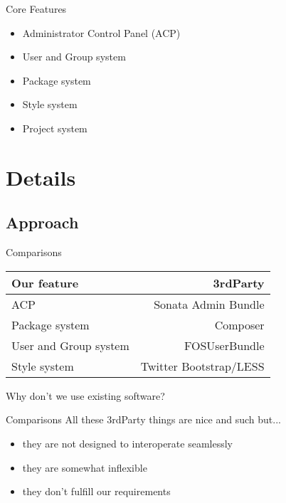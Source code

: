 \documentclass{beamer}
\begin{document}
	\begin{frame}{Core Features}
		\begin{itemize}
			\item Administrator Control Panel (ACP)
			\item User and Group system
			\item Package system
			\item Style system
			\item Project system
		\end{itemize}
	\end{frame}
	
	\section{Details}
	\subsection{Approach}
	\begin{frame}{Comparisons}
		\begin{table}
			\begin{tabular}{l|r}
				Our feature & 3rdParty \\
				\hline
				ACP & Sonata Admin Bundle \\
				Package system & Composer \\
				User and Group system & FOSUserBundle \\
				Style system & Twitter Bootstrap/LESS
			\end{tabular}
		\end{table}
		
		\centering Why don't we use existing software?
	\end{frame}
	
	\begin{frame}{Comparisons}
		All these 3rdParty things are nice and such but...
		\begin{itemize}
			 \item<2-> they are not designed to interoperate seamlessly
			 \item<3-> they are somewhat inflexible
			 \item<4-> they don't fulfill our requirements
		\end{itemize}
		
	\end{frame}
	
\end{document}
